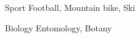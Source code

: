 

\begin{cvpairs}

  
\cvpair
    {Sport} %
    {Football, Mountain bike, Ski} %


\cvpair
    {Biology} %
    {Entomology, Botany} %

\end{cvpairs}